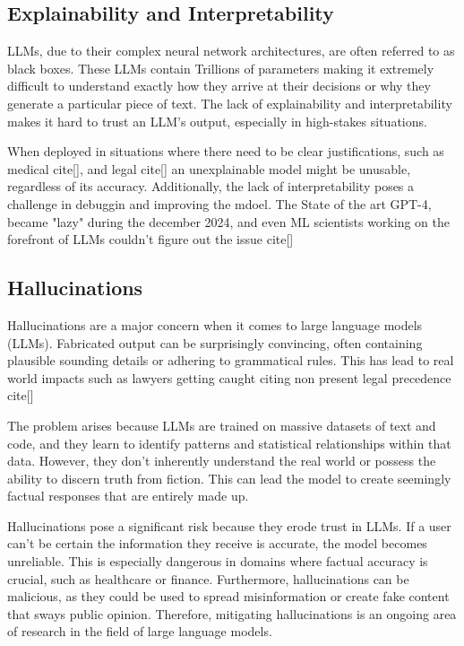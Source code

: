 \documentclass[11pt]{article}
\begin{document}
\subsection{ Explainability and Interpretability}

LLMs, due to their complex neural network architectures, are often referred to as black boxes. These  LLMs contain Trillions of parameters making it extremely difficult to understand exactly how they arrive at their decisions or why they generate a particular piece of text. The lack of explainability and interpretability makes it hard to trust an LLM's output, especially in high-stakes situations.

When deployed in situations where there need to be clear justifications, such as medical cite[], and legal cite[] an unexplainable model might be unusable, regardless of its accuracy. Additionally, the lack of interpretability poses a challenge in debuggin and improving the mdoel. The State of the art GPT-4, became "lazy" during the december 2024, and even ML scientists working on the forefront of LLMs couldn't figure out the issue cite[]

\subsection{ Hallucinations } \label{hallucinations}

Hallucinations are a major concern when it comes to large language models (LLMs).  Fabricated output can be surprisingly convincing, often containing plausible  sounding details or adhering to grammatical rules. This has lead to real world impacts such as lawyers getting caught citing non present legal precedence cite[]

The problem arises because LLMs are trained on massive datasets of text and code, and they learn to identify patterns and statistical relationships within that data. However, they don't inherently understand the real world or possess the ability to discern truth from fiction. This can lead the model to create  seemingly factual responses that are entirely  made up.

Hallucinations pose a significant risk because they erode trust in LLMs. If a user  can't be certain  the information they receive is accurate, the model becomes unreliable. This is especially dangerous in domains where factual accuracy is crucial, such as healthcare or finance.  Furthermore,  hallucinations can be  malicious,  as they could be used to  spread misinformation or create fake content that sways public opinion.  Therefore, mitigating hallucinations is an ongoing area of research in the field of large language models.
\end{document}
